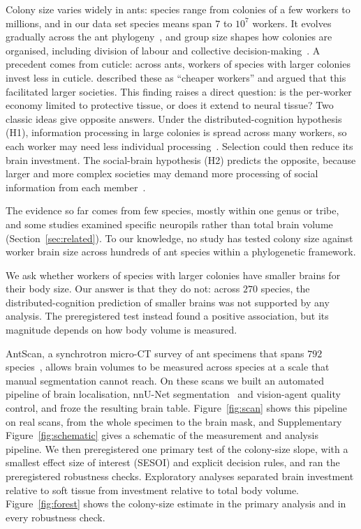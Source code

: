 \documentclass[11pt]{article}
\begin{document}
Colony size varies widely in ants: species range from colonies of a few workers to millions, and in our data set
species means span $7$ to $10^{7}$ workers. It evolves gradually across the ant phylogeny~\citep{burchill2016}, and
group size shapes how colonies are organised, including division of labour and collective
decision-making~\citep{dornhaus2012}. A precedent comes from cuticle: across ants, workers of species with larger
colonies invest less in cuticle. \citet{matte2025} described these as ``cheaper workers'' and argued that this
facilitated larger societies. This finding raises a direct question: is the per-worker economy limited to protective
tissue, or does it extend to neural tissue? Two classic ideas give opposite answers. Under the distributed-cognition
hypothesis (H1), information processing in large colonies is spread across many workers, so each worker may need less
individual processing~\citep{feinerman2016,odonnell2015}. Selection could then reduce its brain investment. The
social-brain hypothesis (H2) predicts the opposite, because larger and more complex societies may demand more
processing of social information from each member~\citep{dunbar1998,gronenberg2009,lihoreau2012}.

The evidence so far comes from few species, mostly within one genus or tribe, and some studies examined specific
neuropils rather than total brain volume (Section~\ref{sec:related}). To our knowledge, no study has tested colony
size against worker brain size across hundreds of ant species within a phylogenetic framework.

We ask whether workers of species with larger colonies have smaller brains for their body size. Our answer is that
they do not: across $270$ species, the distributed-cognition prediction of smaller brains was not supported by any
analysis. The preregistered test instead found a positive association, but its magnitude depends on how body volume
is measured.

AntScan, a synchrotron micro-CT survey of ant specimens that spans $792$ species~\citep{katzke2026}, allows brain
volumes to be measured across species at a scale that manual segmentation cannot reach. On these scans we built an
automated pipeline of brain localisation, nnU-Net segmentation~\citep{isensee2021} and vision-agent quality control,
and froze the resulting brain table. Figure~\ref{fig:scan} shows this pipeline on real scans, from the whole specimen
to the brain mask, and Supplementary Figure~\ref{fig:schematic} gives a schematic of the measurement and analysis
pipeline. We then preregistered one primary test of the colony-size slope, with a smallest effect size of interest
(SESOI) and explicit decision rules, and ran the preregistered robustness checks. Exploratory analyses separated brain
investment relative to soft tissue from investment relative to total body volume. Figure~\ref{fig:forest} shows the
colony-size estimate in the primary analysis and in every robustness check.
\end{document}
